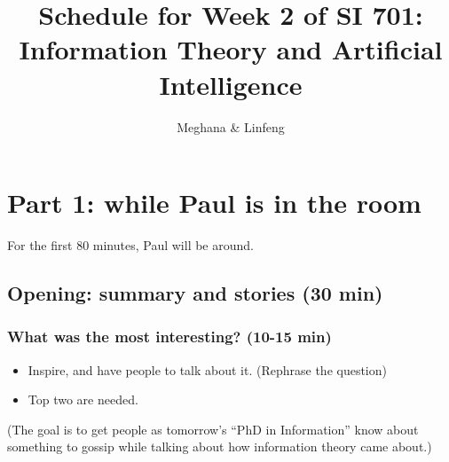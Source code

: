 \documentclass[12pt]{article}
\title{Schedule for Week 2 of SI 701: \\Information Theory and Artificial
Intelligence}
\author{Meghana \& Linfeng }
\theoremstyle{definition}
\theoremstyle{plain}
\begin{document}
\maketitle
\section{Part 1: while Paul is in the room}
For the first 80 minutes, Paul will be around.

\subsection{Opening: summary and stories (30 min)}

\subsubsection{What was the most interesting? (10-15 min)}
\begin{itemize}
    \item Inspire, and have people to talk about it. (Rephrase the question)
    \item Top two are needed.
\end{itemize}

(The goal is to get people as tomorrow's ``PhD in Information'' know about
something to gossip while talking about how information theory came about.)
\end{document}
